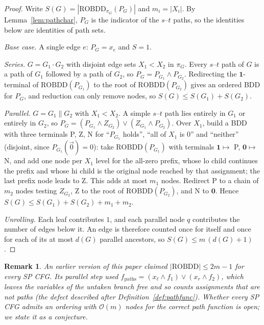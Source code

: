 \documentclass[journal,10pt,twoside]{IEEEtran}
\newtheorem{remark}{Remark}[section]
\newcommand{\ROBDD}{\mathrm{ROBDD}}
\newcommand{\BigO}{\mathcal{O}}
\begin{document}
\begin{proof}
Write $S(G) = |\ROBDD_{\pi_G}(P_G)|$ and $m_i = |X_i|$.  By
Lemma~\ref{lem:pathchar}, $P_G$ is the indicator of the
$s$--$t$ paths, so the identities below are identities of
path sets.

\smallskip\noindent\emph{Base case.}
A single edge $e$: $P_G = x_e$ and $S = 1$.

\smallskip\noindent\emph{Series.} $G = G_1 \cdot G_2$ with
disjoint edge sets $X_1 < X_2$ in $\pi_G$.  Every $s$--$t$
path of $G$ is a path of $G_1$ followed by a path of $G_2$, so
$P_G = P_{G_1} \wedge P_{G_2}$.  Redirecting the
$\mathbf{1}$-terminal of $\ROBDD(P_{G_1})$ to the root of
$\ROBDD(P_{G_2})$ gives an ordered BDD for $P_G$, and reduction
can only remove nodes, so $S(G) \le S(G_1) + S(G_2)$.

\smallskip\noindent\emph{Parallel.} $G = G_1 \parallel G_2$
with $X_1 < X_2$.  A simple $s$--$t$ path lies entirely in
$G_1$ or entirely in $G_2$, so
$P_G = (P_{G_1} \wedge Z_{G_2}) \vee (Z_{G_1} \wedge P_{G_2})$.
Over $X_1$, build a BDD with three terminals \textsf{P},
\textsf{Z}, \textsf{N} for ``$P_{G_1}$ holds'', ``all of $X_1$
is $0$'' and ``neither'' (disjoint, since $P_{G_1}(\vec 0)=0$):
take $\ROBDD(P_{G_1})$ with terminals $\mathbf{1}\mapsto$
\textsf{P}, $\mathbf{0}\mapsto$ \textsf{N}, and add one node per
$X_1$ level for the all-zero prefix, whose $\mathrm{lo}$ child
continues the prefix and whose $\mathrm{hi}$ child is the
original node reached by that assignment; the last prefix node
leads to \textsf{Z}.  This adds at most $m_1$ nodes.  Redirect
\textsf{P} to a chain of $m_2$ nodes testing $Z_{G_2}$,
\textsf{Z} to the root of $\ROBDD(P_{G_2})$, and \textsf{N} to
$\mathbf{0}$.  Hence
$S(G) \le S(G_1) + S(G_2) + m_1 + m_2$.

\smallskip\noindent\emph{Unrolling.}  Each leaf contributes $1$,
and each parallel node $q$ contributes the number of edges
below it.  An edge is therefore counted once for itself and
once for each of its at most $d(G)$ parallel ancestors, so
$S(G) \le m\,(d(G)+1)$.
\end{proof}

\begin{remark}
An earlier version of this paper claimed
$|\ROBDD| \le 2m-1$ for every SP CFG.  Its parallel step used
$f_{\mathrm{paths}} = (x_\ell \wedge f_1) \vee (x_r \wedge f_2)$,
which leaves the variables of the untaken branch free and so
counts assignments that are not paths (the defect described
after Definition~\ref{def:pathfunc}).  Whether every SP CFG
admits an ordering with $\BigO(m)$ nodes for the correct path
function is open; we state it as a conjecture.
\end{remark}
\end{document}
